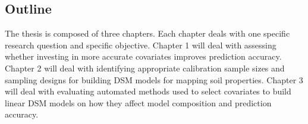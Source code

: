 \subsection{Outline}

The thesis is composed of three chapters. Each chapter deals with one specific 
research question and specific objective. Chapter 1 will deal with assessing 
whether investing in more accurate covariates improves prediction accuracy. 
Chapter 2 will deal with identifying appropriate calibration sample sizes and 
sampling designs for building DSM models for mapping soil properties. Chapter 3 
will deal with evaluating automated methods used to select covariates to build 
linear DSM models on how they affect model composition and prediction accuracy.
